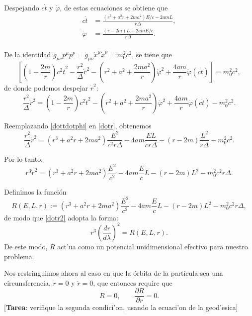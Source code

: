 Despejando $c\dot{t}$ y $\dot{\varphi}$, de estas ecuaciones se obtiene que
\begin{equation}
\begin{aligned}
c\dot{t}&=\frac{(r^3+a^2r+2ma^2)E/c-2amL}{r\Delta},\\ \label{dottdotphi}
\dot{\varphi}&=\frac{(r-2m)L+2amE/c}{r\Delta}.\\
\end{aligned}
\end{equation}

De la identidad $g_{\mu \nu}p^{\mu} p^{\nu}=g_{\mu \nu}\dot{x}^{\mu}\dot{x}^{\nu}=m_0^2c^2$, se tiene que 
\begin{equation}\label{pp=m2c2}
\left[\left(1-\frac{2m}{r}\right)c^2\dot{t}^2-\frac{r^2}{\Delta}\dot{r}^2-\left(r^2+a^2+\frac{2ma^2}{r}\right)\dot{\varphi}^2
+\frac{4am}{r}\dot{\varphi}(c\dot{t}) \right]=m_0^2c^2,
\end{equation}
de donde podemos despejar $\dot{r}^2$:
\begin{equation}\label{dotr}
\frac{r^2}{\Delta}\dot{r}^2=\left(1-\frac{2m}{r}\right)c^2\dot{t}^2-\left(r^2+a^2+\frac{2ma^2}{r}\right)\dot{\varphi}^2
+\frac{4am}{r}\dot{\varphi}(c\dot{t}) -m_0^2c^2.
\end{equation}

Reemplazando \eqref{dottdotphi} en \eqref{dotr}, obtenemos
\begin{equation}
\frac{r^2}{\Delta}\dot{r}^2=\left( r^3+a^2r+2ma^2\right)\frac{E^2}{c^2r\Delta}-4am\frac{EL}{cr\Delta}-\left(r-2m\right)\frac{L^2}{r\Delta}-m_0^2c^2.
\end{equation}

Por lo tanto,
\begin{equation}\label{dotr2}
r^3\dot{r}^2=\left( r^3+a^2r+2ma^2\right)\frac{E^2}{c^2}-4am\frac{E}{c}L-\left(r-2m\right)L^2-m_0^2c^2r\Delta .
\end{equation}

Definimos la funci\'on
\begin{equation}\label{R}
R(E,L,r):=\left( r^3+a^2r+2ma^2\right)\frac{E^2}{c^2}-4am\frac{E}{c}L-\left(r-2m\right)L^2-m_0^2c^2r\Delta,
\end{equation}
de modo que \eqref{dotr2} adopta la forma:
\begin{equation}
r^3\left(\frac{dr}{d\lambda}\right)^2=R(E,L,r).
\end{equation}
De este modo, $R$ act'ua como un potencial unidimensional efectivo para nuestro problema.


Nos restringuimos ahora al caso en que la \'orbita de la part\'icula sea una circunsferencia, $\dot{r}=0$ y $\ddot{r}=0$, que entonces require que 
\begin{equation}
R=0, \qquad \frac{\partial R}{\partial r}=0.
\end{equation}
[\textbf{Tarea}: verifique la segunda condici'on, usando la ecuaci'on de la geod'esica]

